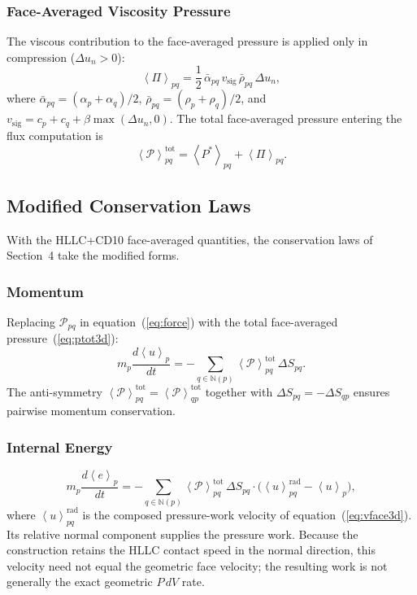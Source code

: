 \documentclass[twocolumn]{aastex63}
\newcommand{\vel}{{u}}
\newcommand{\surf}[0]{S}
\newcommand{\pressure}[0]{\mathcal{P}}
\begin{document}
\subsubsection{Face-Averaged Viscosity Pressure}

The viscous contribution to the face-averaged pressure is
applied only in compression
($\Delta\vel_n > 0$):
\begin{equation}\label{eq:pi3d}
  \left<\Pi\right>_{pq}
  = \frac{1}{2}\,\bar\alpha_{pq}\,
    v_\mathrm{sig}\,
    \bar\rho_{pq}\,\Delta\vel_n,
\end{equation}
where
$\bar\alpha_{pq} = (\alpha_p + \alpha_q)/2$,
$\bar\rho_{pq} = (\rho_p + \rho_q)/2$, and
$v_\mathrm{sig} = c_p + c_q + \beta\max(\Delta\vel_n,0)$.
The total face-averaged pressure entering the flux
computation is
\begin{equation}\label{eq:ptot3d}
  \left<\pressure\right>_{pq}^\textrm{tot}
  = \left<P^*\right>_{pq} + \left<\Pi\right>_{pq}.
\end{equation}


\subsection{Modified Conservation Laws}

With the HLLC+CD10 face-averaged quantities, the
conservation laws of Section~4 take the modified forms.

\subsubsection{Momentum}

Replacing $\pressure_{pq}$ in equation~(\ref{eq:force})
with the total face-averaged pressure~(\ref{eq:ptot3d}):
\begin{equation}\label{eq:mom3d}
  m_p\frac{d\left<\vel\right>_p}{dt}
  = -\sum_{q\in\mathbb{N}(p)}
    \left<\pressure\right>_{pq}^\textrm{tot}
    \,\Delta\surf_{pq}.
\end{equation}
The anti-symmetry
$\left<\pressure\right>_{pq}^\textrm{tot}
 = \left<\pressure\right>_{qp}^\textrm{tot}$
together with $\Delta\surf_{pq} = -\Delta\surf_{qp}$ ensures
pairwise momentum conservation.

\subsubsection{Internal Energy}

\begin{equation}\label{eq:eng3d}
  m_p\frac{d\left<e\right>_p}{dt}
  = -\sum_{q\in\mathbb{N}(p)}
    \left<\pressure\right>_{pq}^\textrm{tot}
    \,\Delta\surf_{pq}\cdot
    \bigl(\left<\vel\right>_{pq}^\textrm{rad}
      - \left<\vel\right>_p\bigr),
\end{equation}
where $\left<\vel\right>_{pq}^\textrm{rad}$ is the composed
pressure-work velocity of equation~(\ref{eq:vface3d}). Its relative normal
component supplies the pressure work. Because the construction retains the
HLLC contact speed in the normal direction, this velocity need not equal the
geometric face velocity; the resulting work is not generally the exact
geometric $P\,dV$ rate.
\end{document}
